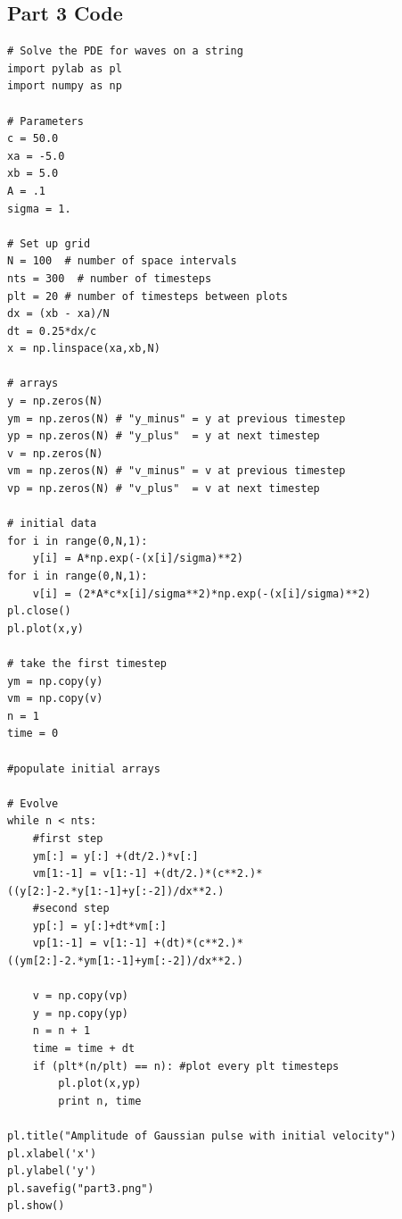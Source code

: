 \documentclass[11pt]{article}
\begin{document}
\subsection{Part 3 Code}
\begin{verbatim}
# Solve the PDE for waves on a string
import pylab as pl
import numpy as np

# Parameters
c = 50.0
xa = -5.0
xb = 5.0
A = .1
sigma = 1.

# Set up grid
N = 100  # number of space intervals
nts = 300  # number of timesteps
plt = 20 # number of timesteps between plots
dx = (xb - xa)/N
dt = 0.25*dx/c
x = np.linspace(xa,xb,N)

# arrays
y = np.zeros(N)
ym = np.zeros(N) # "y_minus" = y at previous timestep
yp = np.zeros(N) # "y_plus"  = y at next timestep
v = np.zeros(N)
vm = np.zeros(N) # "v_minus" = v at previous timestep
vp = np.zeros(N) # "v_plus"  = v at next timestep

# initial data
for i in range(0,N,1):
    y[i] = A*np.exp(-(x[i]/sigma)**2)
for i in range(0,N,1):
    v[i] = (2*A*c*x[i]/sigma**2)*np.exp(-(x[i]/sigma)**2)
pl.close()
pl.plot(x,y)

# take the first timestep
ym = np.copy(y)
vm = np.copy(v)
n = 1
time = 0

#populate initial arrays

# Evolve
while n < nts:
    #first step
    ym[:] = y[:] +(dt/2.)*v[:]
    vm[1:-1] = v[1:-1] +(dt/2.)*(c**2.)*((y[2:]-2.*y[1:-1]+y[:-2])/dx**2.)
    #second step
    yp[:] = y[:]+dt*vm[:]
    vp[1:-1] = v[1:-1] +(dt)*(c**2.)*((ym[2:]-2.*ym[1:-1]+ym[:-2])/dx**2.)
    
    v = np.copy(vp)
    y = np.copy(yp)
    n = n + 1
    time = time + dt
    if (plt*(n/plt) == n): #plot every plt timesteps
        pl.plot(x,yp)
        print n, time
       
pl.title("Amplitude of Gaussian pulse with initial velocity")
pl.xlabel('x')
pl.ylabel('y')
pl.savefig("part3.png")
pl.show()

\end{verbatim}
\end{document}

